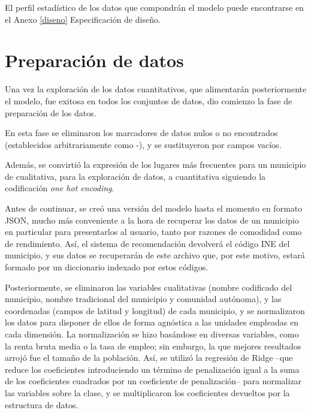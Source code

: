 El perfil estadístico de los datos que compondrán el modelo puede encontrarse en el Anexo \ref{diseno} \guillemotleft Especificación de diseño\guillemotright.

\section{Preparación de datos}

Una vez la exploración de los datos cuantitativos, que alimentarán posteriormente el modelo, fue exitosa en todos los conjuntos de datos, dio comienzo la fase de preparación de los datos.

En esta fase se eliminaron los marcadores de datos nulos o no encontrados (establecidos arbitrariamente como \guillemotleft -\guillemotright\space), y se sustituyeron por campos vacíos.


Además, se convirtió la expresión de los lugares más frecuentes para un municipio de cualitativa, para la exploración de datos, a cuantitativa siguiendo la codificación \textit{one hot encoding}.


Antes de continuar, se creó una versión del modelo hasta el momento en formato JSON, mucho más conveniente a la hora de recuperar los datos de un municipio en particular para presentarlos al usuario, tanto por razones de comodidad como de rendimiento. Así, el sistema de recomendación devolverá el código INE del municipio, y sus datos se recuperarán de este archivo que, por este motivo, estará formado por un diccionario indexado por estos códigos.

Posteriormente, se eliminaron las variables cualitativas (nombre codificado del municipio, nombre tradicional del municipio y comunidad autónoma), y las coordenadas (campos de latitud y longitud) de cada municipio, y se normalizaron los datos para disponer de ellos de forma agnóstica a las unidades empleadas en cada dimensión. La normalización se hizo basándose en diversas variables, como la renta bruta media o la tasa de empleo; sin embargo, la que mejores resultados arrojó fue el tamaño de la población. Así, se utilizó la regresión de Ridge –que reduce los coeficientes introduciendo un término de penalización igual a la suma de los coeficientes cuadrados por un coeficiente de penalización– para normalizar las variables sobre la clase, y se multiplicaron los coeficientes devueltos por la estructura de datos.

